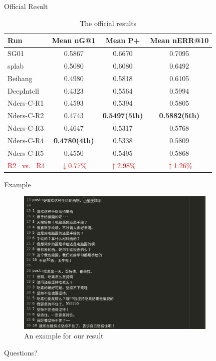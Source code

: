 \documentclass[aspectratio=169]{beamer} %
\begin{document}
  \begin{frame}{Official Result}
        \begin{table}
    \centering
    \caption{The official results}
    \label{tab:commands}
    \begin{minipage}{\columnwidth}
    \begin{center}
    \begin{tabular}{|l|c|c|c|}
    \hline
     Run        &  Mean nG@1  &  Mean P+  &  Mean nERR@10  \\ \hline
     SG01 & 0.5867 & 0.6670 & 0.7095 \\ \hline
     splab & 0.5080 & 0.6080 & 0.6492 \\ \hline
     Beihang & 0.4980 & 0.5818 & 0.6105 \\ \hline
     DeepIntell & 0.4323 & 0.5564 & 0.5994 \\ \hline
     Nders-C-R1 & 0.4593 & 0.5394 & 0.5805 \\ \hline
     Nders-C-R2 & 0.4743 & \textbf{0.5497(5th)} & \textbf{0.5882(5th)} \\ \hline
     Nders-C-R3 & 0.4647 & 0.5317 & 0.5768 \\ \hline
     Nders-C-R4 & \textbf{0.4780(4th)} & 0.5338 & 0.5809 \\ \hline
     Nders-C-R5 & 0.4550 & 0.5495 & 0.5868 \\ \hline
     \textcolor{red}{R2 \ vs. \  R4}  & \textcolor{red}{$\downarrow$0.77\%} & \textcolor{red}{$\uparrow$2.98\%} & \textcolor{red}{$\uparrow$1.26\%} \\ \hline

    \end{tabular}
    \end{center}
    \end{minipage}
    \end{table}
  \end{frame}

  \begin{frame}{Example}
    
    \begin{center}
      \begin{figure}
      \includegraphics[width=9.59cm,height=7cm]{stc-result.png}
      \caption{An example for our result}
      \end{figure}
    \end{center}
  \end{frame}

  \begin{frame}[standout]
    Questions?
  \end{frame}
\end{document}

